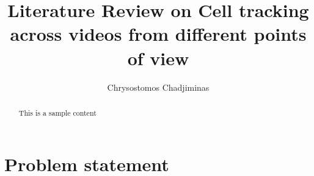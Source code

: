 \documentclass[]{article}
\title{Literature Review on Cell tracking across videos from different points of view}
\author{Chrysostomos Chadjiminas}
\begin{document}
\maketitle

\begin{abstract}
	This is a sample content
\end{abstract}


\section{Problem statement}


%
\end{document}
